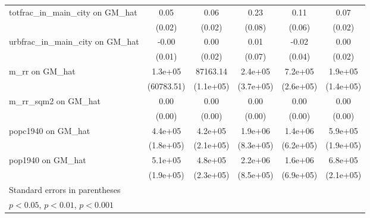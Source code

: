 \begin{table}[htbp]
\begin{tabular}{l*{5}{c}}
\addlinespace
totfrac\_in\_main\_city on GM\_hat&     0.05\sym{**} &     0.06\sym{**} &     0.23\sym{**} &     0.11         &     0.07\sym{***}\\
                &   (0.02)         &   (0.02)         &   (0.08)         &   (0.06)         &   (0.02)         \\
\addlinespace
urbfrac\_in\_main\_city on GM\_hat&    -0.00         &     0.00         &     0.01         &    -0.02         &     0.00         \\
                &   (0.01)         &   (0.02)         &   (0.07)         &   (0.04)         &   (0.02)         \\
\addlinespace
m\_rr on GM\_hat  &  1.3e+05\sym{*}  & 87163.14         &  2.4e+05         &  7.2e+05\sym{**} &  1.9e+05         \\
                &(60783.51)         &(1.1e+05)         &(3.7e+05)         &(2.6e+05)         &(1.4e+05)         \\
\addlinespace
m\_rr\_sqm2 on GM\_hat&     0.00\sym{*}  &     0.00\sym{*}  &     0.00\sym{**} &     0.00         &     0.00\sym{**} \\
                &   (0.00)         &   (0.00)         &   (0.00)         &   (0.00)         &   (0.00)         \\
\addlinespace
popc1940 on GM\_hat&  4.4e+05\sym{*}  &  4.2e+05\sym{*}  &  1.9e+06\sym{*}  &  1.4e+06\sym{*}  &  5.9e+05\sym{**} \\
                &(1.8e+05)         &(2.1e+05)         &(8.3e+05)         &(6.2e+05)         &(1.9e+05)         \\
\addlinespace
pop1940 on GM\_hat&  5.1e+05\sym{**} &  4.8e+05\sym{*}  &  2.2e+06\sym{**} &  1.6e+06\sym{*}  &  6.8e+05\sym{**} \\
                &(1.9e+05)         &(2.3e+05)         &(8.5e+05)         &(6.9e+05)         &(2.1e+05)         \\
\bottomrule
\multicolumn{6}{l}{\footnotesize Standard errors in parentheses}\\
\multicolumn{6}{l}{\footnotesize \sym{*} \(p<0.05\), \sym{**} \(p<0.01\), \sym{***} \(p<0.001\)}\\
\end{tabular}
\end{table}

